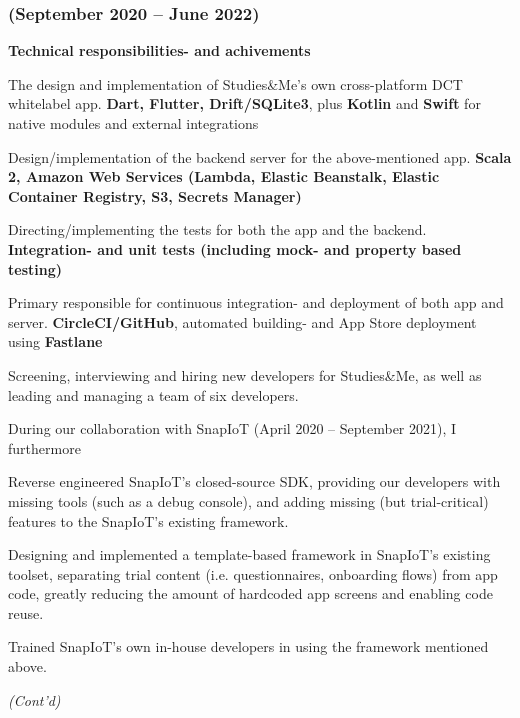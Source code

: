 \documentclass[10pt, a4paper]{article}
\newcommand{\sme}{Studies\&Me}
\begin{document}
\subsubsection*{{\normalfont(September 2020 -- June 2022)}}
\textbf{Technical responsibilities- and achivements}
\begin{outline}
  \1 The design and implementation of \sme's own cross-platform DCT whitelabel app.\newline
    {\footnotesize \textbf{Dart, Flutter, Drift/SQLite3}, plus \textbf{Kotlin} and \textbf{Swift} for native modules and external integrations}

  \1 Design/implementation of the backend server for the above-mentioned app.\newline
  {\footnotesize \textbf{Scala 2, Amazon Web Services (Lambda, Elastic Beanstalk, Elastic Container Registry, S3, Secrets Manager)}}

  \1 Directing/implementing the tests for both the app and the backend.\newline
    {\footnotesize \textbf{Integration- and unit tests (including mock- and property based testing)}}

  \1 Primary responsible for continuous integration- and deployment of both app and server.\newline
    {\footnotesize \textbf{CircleCI/GitHub}, automated building- and App Store deployment using \textbf{Fastlane}}

  \1 Screening, interviewing and hiring new developers for \sme, as well as leading and managing a team of six developers.
\end{outline}

During our collaboration with SnapIoT (April 2020 -- September 2021), I furthermore
\begin{outline}
  \1 Reverse engineered SnapIoT's closed-source SDK, providing our developers with missing tools (such as a debug console), and adding missing (but trial-critical) features to the SnapIoT's existing framework.

  \1 Designing and implemented a template-based framework in SnapIoT's existing toolset, separating trial content (i.e. questionnaires, onboarding flows) from app code, greatly reducing the amount of hardcoded app screens and enabling code reuse.
  
  \1 Trained SnapIoT's own in-house developers in using the framework mentioned above.
\end{outline}
\vspace*{\fill}
\textit{(Cont'd)}
\end{document}
